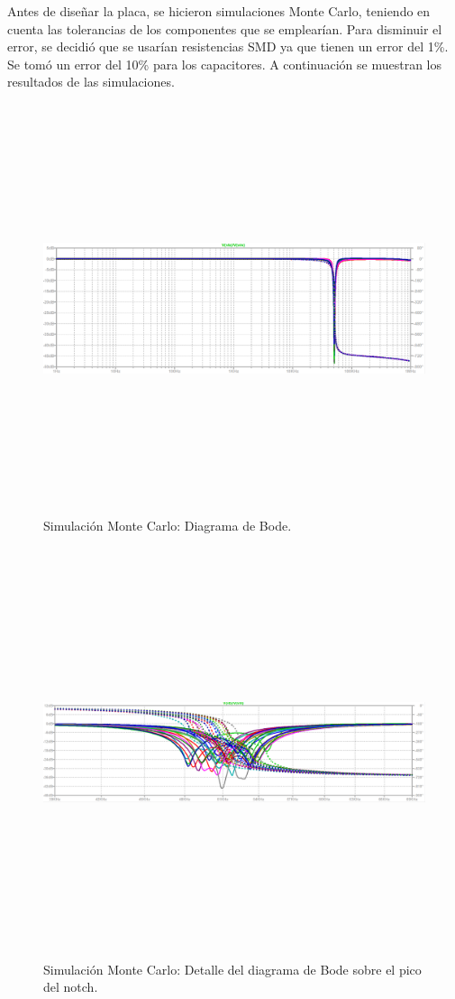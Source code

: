 Antes de dise\~nar la placa, se hicieron simulaciones Monte Carlo, teniendo en cuenta las tolerancias de los componentes que se emplear\'ian. Para disminuir el error, se decidi\'o que se usar\'ian resistencias SMD ya que tienen un error del 1\%. Se tom\'o un error del 10\% para los capacitores. A continuaci\'on se muestran los resultados de las simulaciones. 

 \begin{figure}[H] %
	\centering	\includegraphics[width=12cm,height=12cm,keepaspectratio]{../EJ4/graficos/h_montecarlo_malo.png}
	\caption{Simulaci\'on Monte Carlo: Diagrama de Bode.}
	\label{sim_bode}
\end{figure}

 \begin{figure}[H] %
	\centering	\includegraphics[width=12cm,height=12cm,keepaspectratio]{../EJ4/graficos/h_montecarlo_caps.png}
	\caption{Simulaci\'on Monte Carlo: Detalle del diagrama de Bode sobre el pico del notch.}
	\label{sim_bode_caps}
\end{figure}

